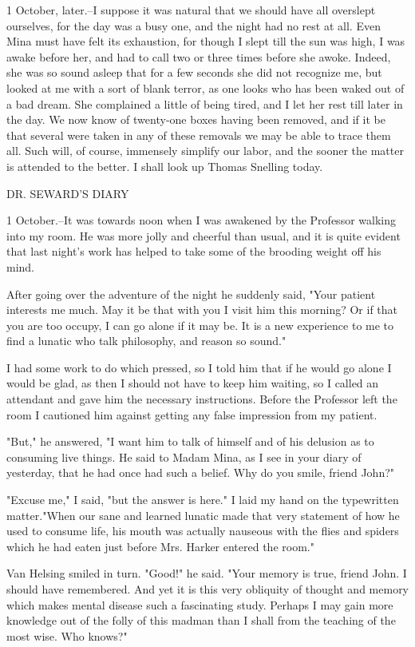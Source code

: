1 October, later.--I suppose it was natural that we should have all overslept ourselves, for the day was a busy one, and the night had no rest at all. Even Mina must have felt its exhaustion, for though I slept till the sun was high, I was awake before her, and had to call two or three times before she awoke. Indeed, she was so sound asleep that for a few seconds she did not recognize me, but looked at me with a sort of blank terror, as one looks who has been waked out of a bad dream. She complained a little of being tired, and I let her rest till later in the day. We now know of twenty-one boxes having been removed, and if it be that several were taken in any of these removals we may be able to trace them all. Such will, of course, immensely simplify our labor, and the sooner the matter is attended to the better. I shall look up Thomas Snelling today. 

DR. SEWARD'S DIARY 

1 October.--It was towards noon when I was awakened by the Professor walking into my room. He was more jolly and cheerful than usual, and it is quite evident that last night's work has helped to take some of the brooding weight off his mind. 

After going over the adventure of the night he suddenly said, "Your patient interests me much. May it be that with you I visit him this morning? Or if that you are too occupy, I can go alone if it may be. It is a new experience to me to find a lunatic who talk philosophy, and reason so sound." 

I had some work to do which pressed, so I told him that if he would go alone I would be glad, as then I should not have to keep him waiting, so I called an attendant and gave him the necessary instructions. Before the Professor left the room I cautioned him against getting any false impression from my patient. 

"But," he answered, "I want him to talk of himself and of his delusion as to consuming live things. He said to Madam Mina, as I see in your diary of yesterday, that he had once had such a belief. Why do you smile, friend John?" 

"Excuse me," I said, "but the answer is here." I laid my hand on the typewritten matter."When our sane and learned lunatic made that very statement of how he used to consume life, his mouth was actually nauseous with the flies and spiders which he had eaten just before Mrs. Harker entered the room." 

Van Helsing smiled in turn. "Good!" he said. "Your memory is true, friend John. I should have remembered. And yet it is this very obliquity of thought and memory which makes mental disease such a fascinating study. Perhaps I may gain more knowledge out of the folly of this madman than I shall from the teaching of the most wise. Who knows?" 

